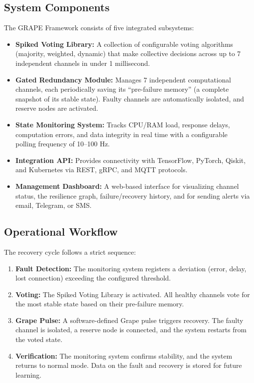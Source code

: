 \documentclass[12pt]{article}
\begin{document}
\subsection{System Components}
The GRAPE Framework consists of five integrated subsystems:
\begin{itemize}
    \item \textbf{Spiked Voting Library:} A collection of configurable voting algorithms (majority, weighted, dynamic) that make collective decisions across up to 7 independent channels in under 1 millisecond.
    \item \textbf{Gated Redundancy Module:} Manages 7 independent computational channels, each periodically saving its ``pre-failure memory'' (a complete snapshot of its stable state). Faulty channels are automatically isolated, and reserve nodes are activated.
    \item \textbf{State Monitoring System:} Tracks CPU/RAM load, response delays, computation errors, and data integrity in real time with a configurable polling frequency of 10--100 Hz.
    \item \textbf{Integration API:} Provides connectivity with TensorFlow, PyTorch, Qiskit, and Kubernetes via REST, gRPC, and MQTT protocols.
    \item \textbf{Management Dashboard:} A web-based interface for visualizing channel status, the resilience graph, failure/recovery history, and for sending alerts via email, Telegram, or SMS.
\end{itemize}

\subsection{Operational Workflow}
The recovery cycle follows a strict sequence:
\begin{enumerate}
    \item \textbf{Fault Detection:} The monitoring system registers a deviation (error, delay, lost connection) exceeding the configured threshold.
    \item \textbf{Voting:} The Spiked Voting Library is activated. All healthy channels vote for the most stable state based on their pre-failure memory.
    \item \textbf{Grape Pulse:} A software-defined Grape pulse triggers recovery. The faulty channel is isolated, a reserve node is connected, and the system restarts from the voted state.
    \item \textbf{Verification:} The monitoring system confirms stability, and the system returns to normal mode. Data on the fault and recovery is stored for future learning.
\end{enumerate}
\end{document}
